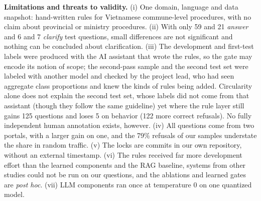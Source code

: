 \textbf{Limitations and threats to validity.} (i) One domain, language and data snapshot: hand-written rules for Vietnamese commune-level
procedures, with no claim about provincial or ministry procedures. (ii) With only 59 and 21 \emph{answer} and 6 and 7 \emph{clarify} test
questions, small differences are not significant and nothing can be concluded about clarification. (iii) The development and first-test
labels were produced with the AI assistant that wrote the rules, so the gate may encode its notion of scope; the second-pass sample and the
second test set were labeled with another model and checked by the project lead, who had seen aggregate class proportions and knew the
kinds of rules being added. Circularity alone does not explain the second test set, whose labels did not come from that assistant (though they follow the
same guideline) yet where the rule layer still gains 125 questions and loses 5 on behavior (122 more correct refusals). No fully independent human annotation exists, however. (iv) All questions come from two portals, with a larger gain on one, and the 79\% refusals of our samples understate the share in random
traffic. (v) The locks are commits in our own repository, without an external timestamp. (vi) The rules received far more development
effort than the learned components and the RAG baseline, systems from other studies could not be run on our questions, and the ablations
and learned gates are \emph{post hoc}. (vii) LLM components ran once at temperature 0 on one quantized model.
